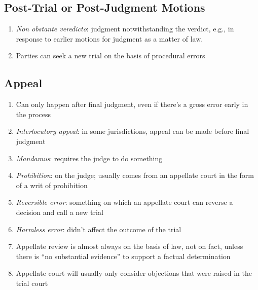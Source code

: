 \subsection{Post-Trial or Post-Judgment Motions}

\begin{enumerate}
    \item \emph{Non obstante veredicto}: judgment notwithstanding the verdict, e.g., in response to earlier motions for judgment as a matter of law.
    \item Parties can seek a new trial on the basis of procedural errors
\end{enumerate}

\subsection{Appeal}

\begin{enumerate}
    \item Can only happen after final judgment, even if there's a gross error early in the process
    \item \emph{Interlocutory appeal}: in some jurisdictions, appeal can be made before final judgment
    \item \emph{Mandamus}: requires the judge to do something
    \item \emph{Prohibition}: on the judge; usually comes from an appellate court in the form of a writ of prohibition
    \item \emph{Reversible error}: something on which an appellate court can reverse a decision and call a new trial
    \item \emph{Harmless error}: didn't affect the outcome of the trial
    \item Appellate review is almost always on the basis of law, not on fact, unless there is ``no substantial evidence'' to support a factual determination
    \item Appellate court will usually only consider objections that were raised in the trial court
\end{enumerate}
